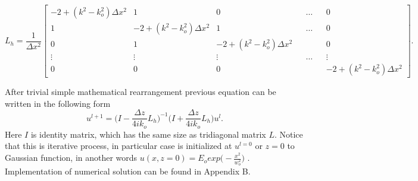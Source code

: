 \documentclass[a4paper]{article}
\begin{document}
	\setlength\arraycolsep{-4.5pt}
	\[ L _h= \frac{1}{\Delta x^2}\begin{bmatrix}
    -2+(k^2-k_o^2)\Delta x^2& 1& 0& &\dots& & 0 \\
    1 & -2+(k^2-k_o^2)\Delta x^2 & 1& &\dots& & 0 \\
    0 &     1& -2+(k^2-k_o^2)\Delta x^2 & & & & 0 \\
    \vdots & \vdots & \vdots & &\dots& & \vdots \\
    0& 0& 0& && &     -2+(k^2-k_o^2)\Delta x^2
	\end{bmatrix}.\]
	
	
	\noindent After trivial simple mathematical rearrangement previous equation can be written in the following form
		\[u^{l+1} = \bigg(I-\frac{\Delta z}{4ik_o}L_h\bigg)^{-1}\bigg(I+\frac{\Delta z}{4ik_o}L_h\bigg) u^l.\]
	Here $I$ is identity matrix, which has the same size as tridiagonal matrix $L$. Notice that this is iterative process, in particular case is initialized at $u^{l=0}$ or $z = 0$ to Gaussian function, in another words $u(x,z=0)= E_oexp\big(-\frac{x^2}{w_o^2}\big)$ \cite{pedrola2015beam, link2}. Implementation of numerical solution can be found in Appendix B.
	
\end{document}
